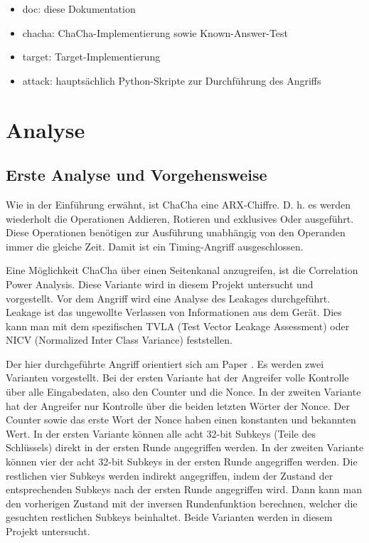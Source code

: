 \documentclass[a4paper,ngerman]{scrreprt}
\begin{document}
\begin{itemize}
    \item doc: diese Dokumentation
    \item chacha: ChaCha-Implementierung sowie Known-Answer-Test
    \item target: Target-Implementierung
    \item attack: hauptsächlich Python-Skripte zur Durchführung des Angriffs
\end{itemize}




\chapter{Analyse}

\section{Erste Analyse und Vorgehensweise}

Wie in der Einführung erwähnt, ist ChaCha eine ARX-Chiffre. D. h. es werden
wiederholt die Operationen Addieren, Rotieren und exklusives Oder ausgeführt.
Diese Operationen benötigen zur Ausführung unabhängig von den Operanden immer
die gleiche Zeit. Damit ist ein Timing-Angriff ausgeschlossen.

Eine Möglichkeit ChaCha über einen Seitenkanal anzugreifen, ist die Correlation
Power Analysis. Diese Variante wird in diesem Projekt untersucht und
vorgestellt. Vor dem Angriff wird eine Analyse des Leakages durchgeführt.
Leakage ist das ungewollte Verlassen von Informationen aus dem Gerät. Dies kann
man mit dem spezifischen TVLA (Test Vector Leakage Assessment) oder NICV
(Normalized Inter Class Variance) feststellen.

Der hier durchgeführte Angriff orientiert sich am Paper
\cite{jungk_bhasin_2017}. Es werden zwei Varianten vorgestellt. Bei der ersten
Variante hat der Angreifer volle Kontrolle über alle Eingabedaten, also den
Counter und die Nonce. In der zweiten Variante hat der Angreifer nur Kontrolle
über die beiden letzten Wörter der Nonce. Der Counter sowie das erste Wort der
Nonce haben einen konstanten und bekannten Wert. In der ersten Variante können
alle acht 32-bit Subkeys (Teile des Schlüssels) direkt in der ersten Runde
angegriffen werden. In der zweiten Variante können vier der acht 32-bit Subkeys
in der ersten Runde angegriffen werden. Die restlichen vier Subkeys werden
indirekt angegriffen, indem der Zustand der entsprechenden Subkeys nach der
ersten Runde angegriffen wird. Dann kann man den vorherigen Zustand mit der
inversen Rundenfunktion berechnen, welcher die gesuchten restlichen Subkeys
beinhaltet. Beide Varianten werden in diesem Projekt untersucht.
\end{document}
